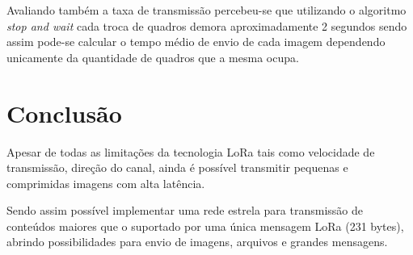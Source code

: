 \documentclass[
article,			%
12pt,				%
oneside,			%
a4paper,			%
english,			%
brazil,				%
sumario=tradicional
]{abntex2}
\begin{document}
Avaliando também a taxa de transmissão percebeu-se que utilizando o algoritmo \textit{stop and wait} cada troca de quadros demora aproximadamente 2 segundos sendo assim pode-se calcular o tempo médio de envio de cada imagem dependendo unicamente da quantidade de quadros que a mesma ocupa.

\cleardoublepage

\section{Conclusão}\label{Conclusão}
Apesar de todas as limitações da tecnologia LoRa tais como velocidade de transmissão, direção do canal, ainda é possível transmitir pequenas e comprimidas imagens com alta latência.

Sendo assim possível implementar uma rede estrela para transmissão de conteúdos maiores que o suportado por uma única mensagem LoRa (231 bytes), abrindo possibilidades para envio de imagens, arquivos e grandes mensagens.


\postextual


\end{document}
